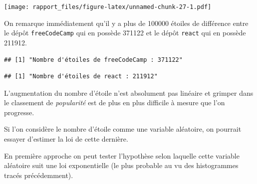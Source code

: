 \documentclass[
]{article}
\newenvironment{Shaded}{\begin{snugshade}}{\end{snugshade}}
\newcommand{\DecValTok}[1]{\textcolor[rgb]{0.00,0.00,0.81}{#1}}
\newcommand{\FunctionTok}[1]{\textcolor[rgb]{0.13,0.29,0.53}{\textbf{#1}}}
\newcommand{\NormalTok}[1]{#1}
\newcommand{\SpecialCharTok}[1]{\textcolor[rgb]{0.81,0.36,0.00}{\textbf{#1}}}
\newcommand{\StringTok}[1]{\textcolor[rgb]{0.31,0.60,0.02}{#1}}
\begin{document}
\texttt{[image: rapport\_files/figure-latex/unnamed-chunk-27-1.pdf]}

On remarque immédiatement qu'il y a plus de 100000 étoiles de différence
entre le dépôt \texttt{freeCodeCamp} qui en possède 371122 et le dépôt
\texttt{react} qui en possède 211912.

\begin{Shaded}
\end{Shaded}

\begin{verbatim}
## [1] "Nombre d'étoiles de freeCodeCamp : 371122"
\end{verbatim}

\begin{Shaded}
\end{Shaded}

\begin{verbatim}
## [1] "Nombre d'étoiles de react : 211912"
\end{verbatim}

L'augmentation du nombre d'étoile n'est absolument pas linéaire et
grimper dans le classement de \emph{popularité} est de plus en plus
difficile à mesure que l'on progresse.

Si l'on considère le nombre d'étoile comme une variable aléatoire, on
pourrait essayer d'estimer la loi de cette dernière.

En première approche on peut tester l'hypothèse selon laquelle cette
variable aléatoire suit une loi exponentielle (le plus probable au vu
des histogrammes tracés précédemment).
\end{document}
